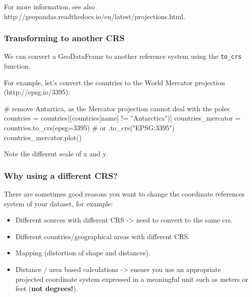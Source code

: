\documentclass[
  letterpaper,
  DIV=11,
  numbers=noendperiod]{scrreprt}
\newenvironment{Shaded}{\begin{snugshade}}{\end{snugshade}}
\newcommand{\CommentTok}[1]{\textcolor[rgb]{0.37,0.37,0.37}{#1}}
\newcommand{\DecValTok}[1]{\textcolor[rgb]{0.68,0.00,0.00}{#1}}
\newcommand{\NormalTok}[1]{\textcolor[rgb]{0.00,0.23,0.31}{#1}}
\newcommand{\OperatorTok}[1]{\textcolor[rgb]{0.37,0.37,0.37}{#1}}
\newcommand{\StringTok}[1]{\textcolor[rgb]{0.13,0.47,0.30}{#1}}
\providecommand{\tightlist}{%
  \setlength{\itemsep}{0pt}\setlength{\parskip}{0pt}}\usepackage{longtable,booktabs,array}
\begin{document}
For more information, see also
http://geopandas.readthedocs.io/en/latest/projections.html.

\hypertarget{transforming-to-another-crs}{%
\subsubsection{Transforming to another
CRS}\label{transforming-to-another-crs}}

We can convert a GeoDataFrame to another reference system using the
\texttt{to\_crs} function.

For example, let's convert the countries to the World Mercator
projection (http://epsg.io/3395):

\begin{Shaded}
\begin{Highlighting}[]
\CommentTok{\# remove Antartica, as the Mercator projection cannot deal with the poles}
\NormalTok{countries }\OperatorTok{=}\NormalTok{ countries[(countries[}\StringTok{\textquotesingle{}name\textquotesingle{}}\NormalTok{] }\OperatorTok{!=} \StringTok{"Antarctica"}\NormalTok{)]}
\NormalTok{countries\_mercator }\OperatorTok{=}\NormalTok{ countries.to\_crs(epsg}\OperatorTok{=}\DecValTok{3395}\NormalTok{)  }\CommentTok{\# or .to\_crs("EPSG:3395")}
\NormalTok{countries\_mercator.plot()}
\end{Highlighting}
\end{Shaded}

Note the different scale of x and y.

\hypertarget{why-using-a-different-crs}{%
\subsubsection{Why using a different
CRS?}\label{why-using-a-different-crs}}

There are sometimes good reasons you want to change the coordinate
references system of your dataset, for example:

\begin{itemize}
\tightlist
\item
  Different sources with different CRS -\textgreater{} need to convert
  to the same crs.\\
\item
  Different countries/geographical areas with different CRS.
\item
  Mapping (distortion of shape and distances).
\item
  Distance / area based calculations -\textgreater{} ensure you use an
  appropriate projected coordinate system expressed in a meaningful unit
  such as meters or feet (\textbf{not degrees!}).
\end{itemize}
\end{document}
